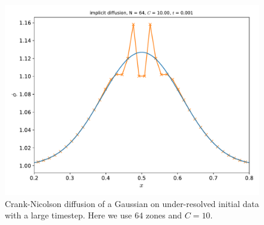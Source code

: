 \begin{figure}
\centering
\includegraphics[width=\linewidth]{diff-implicit-64-CFL_10_0}
\caption[Under-resolved Crank-Nicolson diffusion]
{\label{fig:diff:cnunstable} Crank-Nicolson diffusion of a Gaussian
on under-resolved initial data with a large timestep.  Here we use
$64$ zones and $C= 10$.  \\ }
\end{figure}


